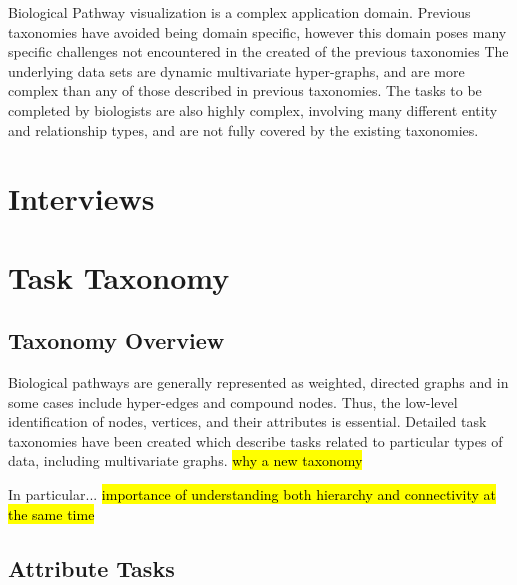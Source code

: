 \documentclass{egpubl}
\begin{document}

Biological Pathway visualization is a complex application domain.
Previous taxonomies have avoided being domain specific, however this domain poses many specific challenges not encountered in the created of the previous taxonomies
The underlying data sets are dynamic multivariate hyper-graphs, and are more complex than any of those described in previous taxonomies.
The tasks to be completed by biologists are also highly complex, involving many different entity and relationship types, and are not fully covered by the existing taxonomies.


\section{Interviews}

\section{Task Taxonomy}

\subsection{Taxonomy Overview}

Biological pathways are generally represented as weighted, directed graphs and in some cases include hyper-edges and compound nodes.
Thus, the low-level identification of nodes, vertices, and their attributes is essential.
Detailed task taxonomies have been created which describe tasks related to particular types of data, including multivariate graphs.
\hl{why a new taxonomy}

In particular...
\hl{importance of understanding both hierarchy and connectivity at the same time}

\subsection{Attribute Tasks}
\end{document}
